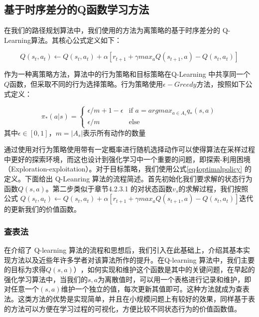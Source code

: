\documentclass{standalone}
\begin{document}
\subsection{基于时序差分的Q函数学习方法}
在我们的路径规划算法中，我们使用的方法为离策略的基于时序差分的 Q-Learning算法。其核心公式定义如下：
\begin{center}
    \begin{equation}
        Q(s_t, a_t) \leftarrow Q(s_t, a_t) + \alpha[r_{t+1} + \gamma max_{a}Q(s_{t+1}, a) - Q(s_t, a_t)]
    \end{equation}
\end{center}
作为一种离策略方法，算法中的行为策略和目标策略在Q-Learning 中共享同一个$Q$函数，但采取不同的行为选择策略。行为策略使用$\epsilon-Greedy$方法，按照如下公式定义：
\begin{center}
    \begin{equation}
    \pi_{*}(a|s) = \begin{cases}
    \epsilon / m + 1 - \epsilon &\mbox{if $a = argmax_{a \in A_s}q_{*}(s, a)$}\\
    \epsilon / m &\mbox{else}
    \end{cases}
    \end{equation}
    \mbox{其中$\epsilon \in [0, 1]$，$m=|A_s|$表示所有动作的数量}
\end{center}
通过使用对行为策略使用带有一定概率进行随机选择动作可以使得算法在采样过程中更好的探索环境，而这也设计到强化学习中一个重要的问题，即探索-利用困境（Exploration-exploitation）。对于目标策略，我们使用公式\ref{eq4optimalpolicy} 的定义。下面给出 Q-Leanring 算法的流程简述。首先初始化我们要求解的状态行为函数$Q(s, a)$。第二步类似于章节4.2.3.1 的对状态函数$v_{s}$的求解过程，我们按照公式 $Q(s_t, a_t) \leftarrow Q(s_t, a_t) + \alpha[r_{t+1} + \gamma max_{a}Q(s_{t+1}, a) - Q(s_t, a_t)]$迭代的更新我们的价值函数。
\subsubsection{查表法}
在介绍了 Q-learning 算法的流程和思想后，我们引入在此基础上，介绍其基本实现方法以及近些年许多学者对该算法所作的提升。在Q-learning 算法中，我们主要的目标为求得$Q(s, a)）$，如何实现和维护这个函数是其中的关键问题，在早起的强化学习算法中，当我们的$s, a$为离散值时，可以用一个表格进行记录和维护，即对任意一个$(s, a)$维护一个独立的值，每次更新其值即可。这种方法就成为查表法。这类方法的优势是实现简单，并且在小规模问题上有较好的效果，同样基于表的方法可以方便在学习过程的可视化，方便比较不同状态行为的价值函数值。
\end{document}
